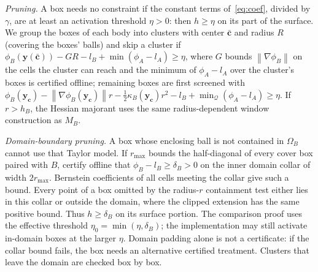 \documentclass[journal]{IEEEtran}
\theoremstyle{definition}
\newcommand{\norm}[1]{\left\lVert #1\right\rVert}
\begin{document}
\emph{Pruning.} A box needs no constraint if the constant terms of~\eqref{eq:coef}, divided by
$\gamma$, are at least an activation threshold $\eta>0$: then $h\ge\eta$ on its part of the surface.
We group the boxes of each body into clusters with center $\bar{\mathbf c}$ and radius $R$ (covering
the boxes' balls) and skip a cluster if $\phi_B(\mathbf y(\bar{\mathbf c}))-GR-l_B+\min(\phi_A-l_A)\ge\eta$,
where $G$ bounds $\norm{\nabla\phi_B}$ on the cells the cluster can reach and the minimum of
$\phi_A-l_A$ over the cluster's boxes is certified offline; remaining boxes are first screened with
$\phi_B(\mathbf y_{\mathbf c})-\norm{\nabla\phi_B(\mathbf y_{\mathbf c})}r-\frac12\kappa_B(\mathbf y_{\mathbf c})r^2-l_B+\min_{\mathcal Q}(\phi_A-l_A)\ge\eta$.
If $r>h_B$, the Hessian majorant uses the same radius-dependent window construction as $M_B$.

\emph{Domain-boundary pruning.} A box whose enclosing ball is not contained in $\Omega_B$
cannot use that Taylor model. If $r_{\max}$ bounds the half-diagonal of every cover box paired
with $B$, certify offline that $\phi_B-l_B\ge\delta_B>0$ on the inner domain collar of width
$2r_{\max}$. Bernstein coefficients of all cells meeting the collar give such a bound.
Every point of a box omitted by the radius-$r$ containment test either lies in this collar or
outside the domain, where the clipped extension has the same positive bound. Thus $h\ge\delta_B$
on its surface portion. The comparison proof uses the effective threshold
$\eta_0=\min(\eta,\delta_B)$; the implementation may still activate in-domain boxes at the larger
$\eta$. Domain padding alone is not a certificate: if the collar bound fails, the box needs an
alternative certified treatment. Clusters that leave the domain are checked box by box.
\end{document}

